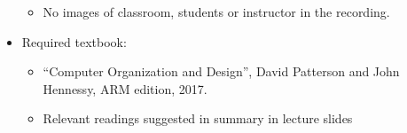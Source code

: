 \begin{frame}[fragile]
\begin{itemize}
\begin{itemize}
\item No images of classroom, students or instructor in the recording.  

\end{itemize} 



\item Required textbook:%

\begin{itemize} 

     \item ``Computer Organization and Design'', David Patterson and John Hennessy, ARM edition, 2017. 

     \item Relevant readings suggested in summary in lecture slides  

\end{itemize}  


  

\end{itemize} 

  

\end{frame} 

\BNotes\ifnum{} 

